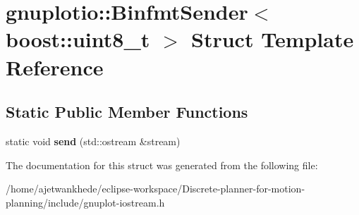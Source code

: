 \hypertarget{structgnuplotio_1_1BinfmtSender_3_01boost_1_1uint8__t_01_4}{}\section{gnuplotio\+:\+:Binfmt\+Sender$<$ boost\+:\+:uint8\+\_\+t $>$ Struct Template Reference}
\label{structgnuplotio_1_1BinfmtSender_3_01boost_1_1uint8__t_01_4}
\subsection*{Static Public Member Functions}
\begin{DoxyCompactItemize}
\item 
\mbox{\label{structgnuplotio_1_1BinfmtSender_3_01boost_1_1uint8__t_01_4_a57d45c45f1ee19614c972bc82c4b214c}} 
static void {\bfseries send} (std\+::ostream \&stream)
\end{DoxyCompactItemize}


The documentation for this struct was generated from the following file\+:\begin{DoxyCompactItemize}
\item 
/home/ajetwankhede/eclipse-\/workspace/\+Discrete-\/planner-\/for-\/motion-\/planning/include/gnuplot-\/iostream.\+h\end{DoxyCompactItemize}
